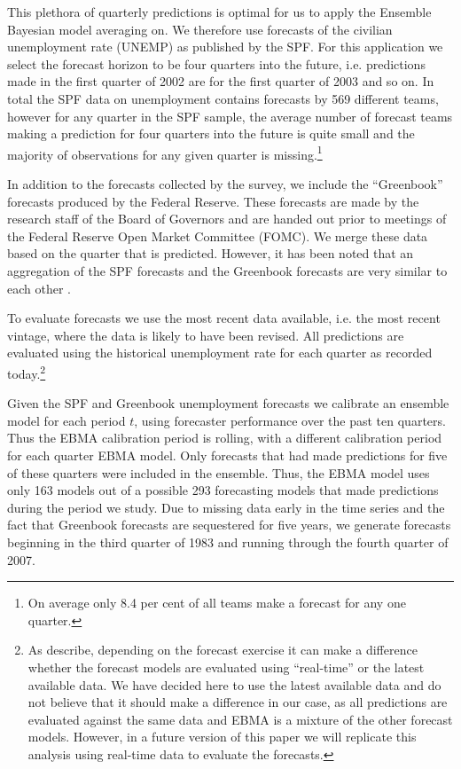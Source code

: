 \documentclass[12pt,fullpage,endnotes]{article}
\begin{document}
This plethora of quarterly predictions is optimal for us to apply the Ensemble Bayesian model averaging on. We therefore use forecasts of the civilian unemployment rate (UNEMP) as published by the SPF. For this application we select the forecast horizon to be four quarters into the future, i.e. predictions made in the first quarter of 2002 are for the first quarter of 2003 and so on. In total the SPF data on unemployment contains forecasts by 569 different teams, however for any quarter in the SPF sample, the average number of forecast teams making a prediction for four quarters into the future is quite small and the majority of observations for any given quarter is missing.\footnote{On average only 8.4 per cent of all teams make a forecast for any one quarter.}

In addition to the forecasts collected by the survey, we include the ``Greenbook'' forecasts produced by the Federal Reserve. These forecasts are made by the research staff of the Board of Governors and are handed out prior to meetings of the Federal Reserve Open Market Committee (FOMC). We merge these data based on the quarter that is predicted. However, it has been noted that an aggregation of the SPF forecasts and the Greenbook forecasts are very similar to each other \citep{Baghestani:2008}. 

To evaluate forecasts we use the most recent data available, i.e. the most recent vintage, where the data is likely to have been revised. All predictions are evaluated using the historical unemployment rate for each quarter as recorded today.\footnote{As \citet{Croushore:Stark:2001} describe, depending on the forecast exercise it can make a difference whether the forecast models are evaluated using ``real-time'' or the latest available data. We have decided here to use the latest available data and do not believe that it should make a difference in our case, as all predictions are evaluated against the same data and EBMA is a mixture of the other forecast models. However, in a future version of this paper we will replicate this analysis using real-time data to evaluate the forecasts.}

Given the SPF and Greenbook unemployment forecasts we calibrate an ensemble model for each period $t$, using forecaster
performance over the past ten quarters. Thus the EBMA calibration period is rolling, with a different calibration period for each quarter EBMA model. Only forecasts that had made
predictions for five of these quarters were included in the ensemble.
Thus, the EBMA model uses only 163 models out of a possible 293
forecasting models that made predictions during the period we study.
Due to missing data early in the time series and the fact that Greenbook forecasts are
sequestered for five years, we generate forecasts beginning in the
third quarter of 1983 and running through the fourth quarter of 2007.
\end{document}
